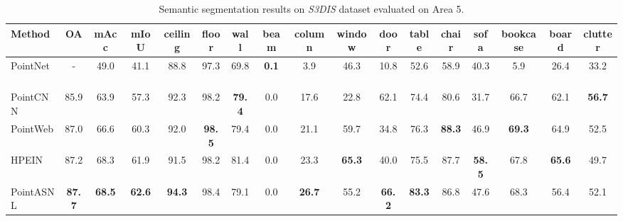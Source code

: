 \documentclass[10pt,twocolumn,letterpaper]{article}
\begin{document}
	\begin{table*}[!htp]
		\renewcommand\tabcolsep{2.5pt} 
		\caption{Semantic segmentation results on \textit{S3DIS} dataset evaluated on Area 5.}
		\begin{center}
			\begin{tabular}{l|ccc|ccccccccccccc}
				\hline
				
				Method& OA &mAcc& mIoU& ceiling &floor& wall& beam& column& window& door& table&  chair &sofa &bookcase& board& clutter \\
				\hline
				\hline
				
				PointNet~\cite{pointnet} &- &49.0 &41.1&88.8 &97.3& 69.8& \bf{0.1}& 3.9& 46.3& 10.8& 52.6& 58.9 &40.3 &5.9 &26.4& 33.2\\
				
				PointCNN~\cite{PointCNN} &85.9& 63.9 &57.3& 92.3& 98.2& \bf{79.4}& 0.0 &17.6& 22.8& {62.1} &74.4&80.6 &31.7&66.7 &62.1& \bf{56.7}\\
				PointWeb~\cite{PointWeb}&87.0& 66.6& 60.3 &92.0 &\bf{98.5} &79.4& 0.0 &21.1 &59.7 &34.8 &76.3 &\bf{88.3} &46.9&\bf{ 69.3}&64.9 &52.5\\
				HPEIN~\cite{HPEIN} &87.2& {68.3}& {61.9}& 91.5& 98.2 &81.4& 0.0 &23.3 &\bf{65.3} &40.0 &75.5& 87.7 &\bf{58.5} &67.8&\bf{ 65.6} &49.7\\
				\hline
				PointASNL & \bf{87.7}&\bf{68.5} &\bf{62.6}&	\bf{94.3}	&98.4	&79.1	&0.0	&\bf{26.7}	&55.2&	\bf{66.2}&	\bf{83.3}	&86.8&	47.6&	68.3	&56.4	&52.1 \\
				\hline
			\end{tabular}
		\end{center}
		\label{tab:S3DIS_A5}
	\end{table*}
	
\end{document}
